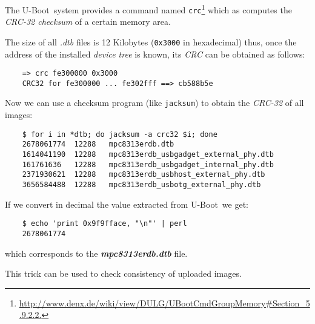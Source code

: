 \documentclass[10pt,a4paper]{article}
\newcommand{\FileName}[1]{\textbf{\textsl{\textsf{{#1}}}}}
\newcommand{\Const}[1]{{{\tt {#1}}}}
\newcommand{\TechName}[1]{\textsf{{#1}}}
\newcommand{\StdName}[1]{\emph{{#1}}}
\newcommand{\Command}[1]{{\tt {#1}}}
\newcommand{\uBoot}{\TechName{U-Boot}}
\begin{document}
            The \uBoot\ system provides a command named
            \Command{crc}\footnote{
                \url{http://www.denx.de/wiki/view/DULG/UBootCmdGroupMemory\#Section\_5.9.2.2.}
            }
            which as computes the \StdName{CRC-32 checksum} of a certain
            memory area.

            The size of all \emph{.dtb} files is 12 Kilobytes
            (\Const{0x3000} in hexadecimal) thus, once
            the address of the installed \emph{device tree} is known, its
            \StdName{CRC} can be obtained as follows:
\begin{lstlisting}
    => crc fe300000 0x3000
    CRC32 for fe300000 ... fe302fff ==> cb588b5e
\end{lstlisting}

            Now we can use a checksum program (like \Command{jacksum}) to
            obtain the \StdName{CRC-32} of all images:
\begin{lstlisting}
    $ for i in *dtb; do jacksum -a crc32 $i; done
    2678061774	12288	mpc8313erdb.dtb
    1614041190	12288	mpc8313erdb_usbgadget_external_phy.dtb
    161761636	12288	mpc8313erdb_usbgadget_internal_phy.dtb
    2371930621	12288	mpc8313erdb_usbhost_external_phy.dtb
    3656584488	12288	mpc8313erdb_usbotg_external_phy.dtb
\end{lstlisting}
            If we convert in decimal the value extracted from \uBoot\ we
            get:
\begin{lstlisting}
    $ echo 'print 0x9f9fface, "\n"' | perl
    2678061774
\end{lstlisting}
            which corresponds to the \FileName{mpc8313erdb.dtb} file.

            This trick can be used to check consistency of uploaded
            images.
\end{document}
